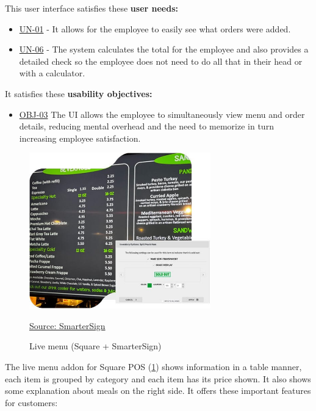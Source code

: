 \documentclass[]{VUMIFTemplateClass}
\begin{document}
This user interface satisfies these \textbf{user needs:}

\begin{itemize}
    \item \hyperref[UN-01]{UN-01} - It allows for the employee to easily see what orders were added.
    \item \hyperref[UN-06]{UN-06} - The system calculates the total for the employee and also provides a detailed check so the employee does not need to do all that in their head or with a calculator.
\end{itemize}

It satisfies these \textbf{usability objectives:}

\begin{itemize}
    \item \hyperref[OBJ-03]{OBJ-03} The UI allows the employee to simultaneously view menu and order details, reducing mental overhead and the need to memorize in turn increasing employee satisfaction.
\end{itemize}



\begin{figure}[H]
    \centering
    \includegraphics[width=0.7\textwidth]{images/examples/live-menu-square-smartersign.jpg}
    \caption{Live menu (Square + SmarterSign)}
    \href{https://smartersign.com/square}{Source: SmarterSign}
    \label{fig:square-menu}
\end{figure}

The live menu addon for Square POS (\ref{fig:square-menu}) shows information in
a table manner, each item is grouped by category and each item has its price
shown. It also shows some explanation about meals on the right side. It
offers these important features for customers:
\end{document}
